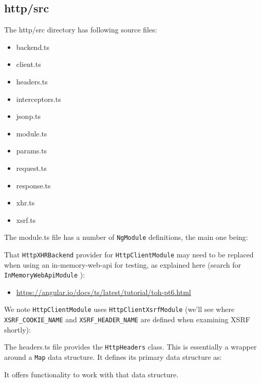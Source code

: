 \subsection{http/src}

The http/src directory has following source files:

\begin{itemize}
  \item backend.ts
  \item client.ts
  \item headers.ts
  \item interceptors.ts
  \item jsonp.ts
  \item module.ts
  \item params.ts
  \item request.ts
  \item response.ts
  \item xhr.ts
  \item xsrf.ts
\end{itemize}

The module.ts file has a number of
\texttt{NgModule}
definitions, the main one being:



That
\texttt{HttpXHRBackend}
provider for
\texttt{HttpClientModule}
may need to be replaced when
using an in-memory-web-api for testing, as explained here (search for
\texttt{InMemoryWebApiModule}
):

\begin{itemize}
  \item \url{https://angular.io/docs/ts/latest/tutorial/toh-pt6.html}
\end{itemize}

We note
\texttt{HttpClientModule}
uses
\texttt{HttpClientXsrfModule}
(we’ll see where
\texttt{XSRF\_COOKIE\_NAME}
and
\texttt{XSRF\_HEADER\_NAME}
are defined when examining XSRF
shortly):



The headers.ts file provides the
\texttt{HttpHeaders}
class. This is essentially a wrapper
around a
\texttt{Map}
data structure. It defines its primary data structure as:



It offers functionality to work with that data structure.



